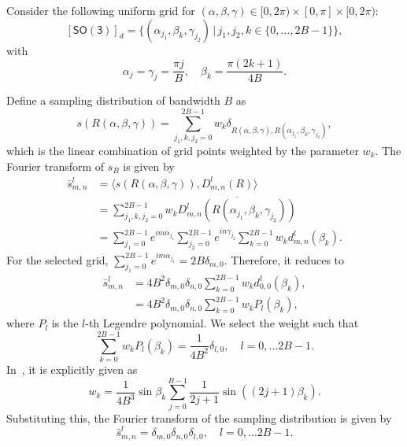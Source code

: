 \documentclass[onecolumn,11pt]{IEEEtran}
\newcommand{\pair}[1]{\ensuremath{\langle #1 \rangle}}
\newcommand{\SO}{\ensuremath{\mathsf{SO(3)}}}
\begin{document}
Consider the following uniform grid for $(\alpha,\beta,\gamma)\in[0,2\pi)\times[0,\pi]\times[0,2\pi)$:
\[
[\SO]_d=\{(\alpha_{j_1},\beta_k,\gamma_{j_2})\,|\, j_1,j_2,k\in\{0,\ldots, 2B-1\}\},
\]
with
\begin{equation}\label{eqn:grid}
\alpha_j=\gamma_j= \frac{\pi j}{B},\quad \beta_k = \frac{\pi (2k+1)}{4B}.
\end{equation}

Define a sampling distribution of bandwidth $B$ as
\begin{equation}
s(R(\alpha,\beta,\gamma))=\sum_{j_1,k,j_2=0}^{2B-1} w_k \delta_{R(\alpha,\beta,\gamma),R(\alpha_{j_1},\beta_k,\gamma_{j_2})},
\end{equation}
which is the linear combination of grid points weighted by the parameter $w_k$. 
The Fourier transform of $s_B$ is given by
\begin{align*}
\bar s^l_{m,n} & = \pair{s(R(\alpha,\beta,\gamma)), D^l_{m,n}(R)}\\
&=\sum_{j_1,k,j_2=0}^{2B-1} w_k \overline{D^l_{m,n}(R(\alpha_{j_1},\beta_k,\gamma_{j_2}))}\\
& = \sum_{j_1=0}^{2B-1} e^{im\alpha_{j_1}}
\sum_{j_2=0}^{2B-1} e^{in\gamma_{j_2}}
\sum_{k=0}^{2B-1} w_k d^l_{m,n}(\beta_k).
\end{align*}
For the selected grid, $\sum_{j_1=0}^{2B-1} e^{im\alpha_{j_1}}=2B \delta_{m,0}$. 
Therefore, it reduces to
\begin{align*}
\bar s^l_{m,n}  
& = 4B^2 \delta_{m,0}\delta_{n,0}\sum_{k=0}^{2B-1} w_k d^l_{0,0}(\beta_k),\\
& = 4B^2 \delta_{m,0}\delta_{n,0}\sum_{k=0}^{2B-1} w_k P_l(\beta_k),
\end{align*}
where $P_l$ is the $l$-th Legendre polynomial. 
We select the weight such that
\begin{equation}
\sum_{k=0}^{2B-1} w_k P_l(\beta_k) = \frac{1}{4B^2} \delta_{l,0},\quad l=0,\ldots 2B-1.
\end{equation}
In~\cite{DriHeaAAM94}, it is explicitly given as
\begin{equation}
w_k = \frac{1}{4B^3}\sin\beta_k \sum_{j=0}^{B-1} \frac{1}{2j+1}\sin((2j+1)\beta_k).
\end{equation}
Substituting this, the Fourier transform of the sampling distribution is given by
\begin{equation}
\bar s ^l_{m,n}=\delta_{m,0}\delta_{n,0}\delta_{l,0},\quad l=0,\ldots 2B-1.
\label{eqn:bar_s}
\end{equation}
\end{document}
